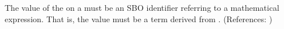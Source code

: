 The value of the   on a \Delay must be an SBO
identifier referring to a mathematical expression.  That is, the value
must be a term derived from \sbomathformula.  (References: 
)
